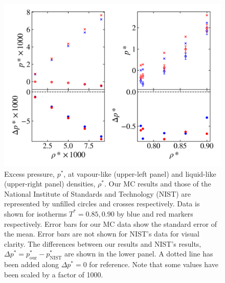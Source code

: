 \documentclass[10pt, twocolumn]{revtex4}    %
\begin{document}
\begin{figure}
	\includegraphics[width=\linewidth]{figures/NIST_comparison/NIST_p.png}
	\caption{Excess pressure, $p^{*}$, at vapour-like (upper-left panel) and liquid-like (upper-right panel) densities, $\rho{}^{*}$. Our MC results and those of the National Institute of Standards and Technology (NIST) are represented by unfilled circles and crosses respectively. Data is shown for isotherms $T^{*}=0.85, 0.90$ by blue and red markers respectively. Error bars for our MC data show the standard error of the mean. Error bars are not shown for NIST's data for visual clarity. The differences between our results and NIST's results, $\Delta{}p^{*} = p_\text{our}^{*} - p_\text{NIST}^{*}$ are shown in the lower panel. A dotted line has been added along $\Delta{}p^{*}=0$ for reference. Note that some values have been scaled by a factor of 1000.}
	\label{fig:NIST_p}
\end{figure}

\end{document}
